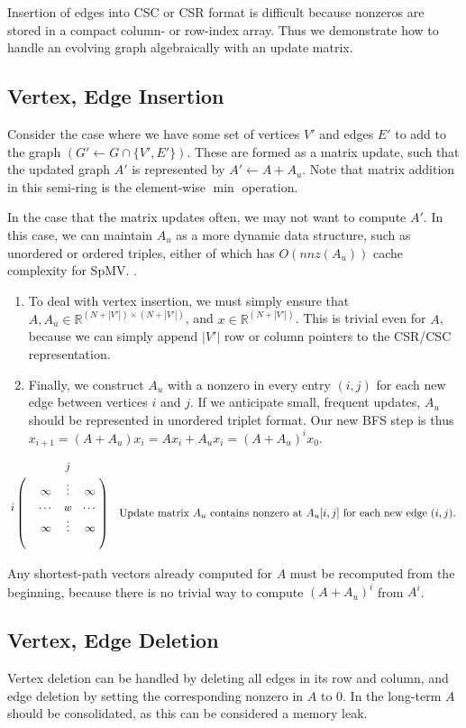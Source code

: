\documentclass[11pt]{article}
\begin{document}
Insertion of edges into CSC or CSR format is difficult because nonzeros are stored in a compact column- or row-index array. Thus we demonstrate how to handle an evolving graph algebraically with an update matrix. 

\subsection{Vertex, Edge Insertion}
Consider the case where we have some set of vertices $V'$ and edges $E'$ to add to the graph $(G' \gets G \cap \{V',E'\})$. These are formed as a matrix update, such that the updated graph $A'$ is represented by $A' \gets A + A_u$. Note that matrix addition in this semi-ring is the element-wise $\min$ operation.

In the case that the matrix updates often, we may not want to compute $A'$. In this case, we can maintain $A_u$ as a more dynamic data structure, such as unordered or ordered triples, either of which has $O(nnz(A_u))$ cache complexity for SpMV. \cite{sparsechapter}.

\begin{enumerate}
\item To deal with vertex insertion, we must simply ensure that $A,A_u \in \mathbb{R}^{(N+|V'|)\times(N+|V'|)}$, and $x \in \mathbb{R}^{(N+|V'|)}$. This is trivial even for $A$, because we can simply append $|V'|$ row or column pointers to the CSR/CSC representation.

\item Finally, we construct $A_u$ with a nonzero in every entry $(i,j)$ for each new edge between vertices $i$ and $j$. If we anticipate small, frequent updates, $A_u$ should be represented in unordered triplet format. Our new BFS step is thus $x_{i+1} = (A+A_u)x_i = Ax_i + A_ux_i = (A+A_u)^ix_0$. 
\end{enumerate}

\begin{align}\bordermatrix{ 
& & & j&  \cr
& & \infty & \vdots & \infty \cr
 i & &  \cdots & w & \cdots   \cr
  & & \infty & \vdots & \infty  \cr
   &  & & &  
} && \text{Update matrix $A_u$ contains nonzero at $A_u[i,j]$ for each new edge $(i,j)$. }\end{align}

Any shortest-path vectors already computed for $A$ must be recomputed from the beginning, because there is no trivial way to compute $(A+A_u)^i$ from $A^i$.



\subsection{Vertex, Edge Deletion}
Vertex deletion can be handled by deleting all edges in its row and column, and edge deletion by setting the corresponding nonzero in $A$ to 0. In the long-term $A$ should be consolidated, as this can be considered a memory leak. 
\end{document}
